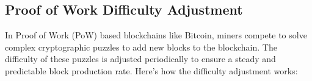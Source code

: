   
  \subsection{Proof of Work Difficulty Adjustment}
  In Proof of Work (PoW) based blockchains like Bitcoin, miners compete to solve complex cryptographic puzzles to add new blocks to the 
  blockchain. The difficulty of these puzzles is adjusted periodically to ensure a steady and predictable block production rate. Here's 
  how the difficulty adjustment works:
  
